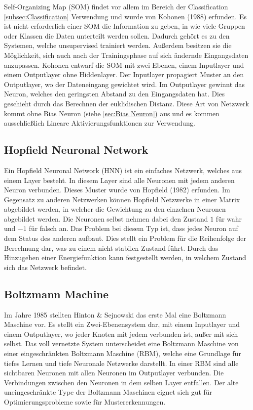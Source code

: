 Self-Organizing Map (SOM) findet vor allem im Bereich der Classification \ref{subsec:Classification} Verwendung und wurde von Kohonen (1988) erfunden. 
Es ist nicht erforderlich einer SOM die Information zu geben, in wie viele Gruppen oder Klassen die Daten unterteilt werden sollen. 
Dadurch gehört es zu den Systemen, welche unsupervised trainiert werden. 
Außerdem besitzen sie die Möglichkeit, sich auch nach der Trainingsphase auf sich ändernde Eingangsdaten anzupassen. 
Kohonen entwarf die SOM mit zwei Ebenen, einem Inputlayer und einem Outputlayer ohne Hiddenlayer. 
Der Inputlayer propagiert Muster an den Outputlayer, wo der Dateneingang gewichtet wird. 
Im Outputlayer gewinnt das Neuron, welches den geringsten Abstand zu den Eingangsdaten hat.
Dies geschieht durch das Berechnen der euklidischen Distanz. 
Diese Art von Netzwerk kommt ohne Bias Neuron (siehe \ref{sec:Bias Neuron}) aus und es kommen ausschließlich Lineare Aktivierungsfunktionen zur Verwendung.


\subsection{Hopfield Neuronal Network}

Ein Hopfield Neuronal Network (HNN) ist ein einfaches Netzwerk, welches aus einem Layer besteht. 
In diesem Layer sind alle Neuronen mit jedem anderen Neuron verbunden. 
Dieses Muster wurde von Hopfield (1982) erfunden. 
Im Gegensatz zu anderen Netzwerken können Hopfield Netzwerke in einer Matrix abgebildet werden, in welcher die Gewichtung zu den einzelnen Neuronen abgebildet werden. 
Die Neuronen selbst nehmen dabei den Zustand $1$ für wahr und $-1$ für falsch an.
Das Problem bei diesem Typ ist, dass jedes Neuron auf dem Status des anderen aufbaut.
Dies stellt ein Problem für die Reihenfolge der Berechnung dar, was zu einem nicht stabilen Zustand führt.
Durch das Hinzugeben einer Energiefunktion kann festgestellt werden, in welchem Zustand sich das Netzwerk befindet.

\subsection{Boltzmann Machine}

Im Jahre 1985 stellten Hinton \& Sejnowski das erste Mal eine Boltzmann Maschine vor.
Es stellt ein Zwei-Ebenensystem dar, mit einem Inputlayer und einem Outputlayer, wo jeder Knoten mit jedem verbunden ist, außer mit sich selbst.
Das voll vernetzte System unterscheidet eine Boltzmann Maschine von einer eingeschränkten Boltzmann Maschine (RBM), welche eine Grundlage für tiefes Lernen und tiefe Neuronale Netzwerke darstellt.
In einer RBM sind alle sichtbaren Neuronen mit allen Neuronen im Outputlayer verbunden. 
Die Verbindungen zwischen den Neuronen in dem selben Layer entfallen.
Der alte uneingeschränkte Type der Boltzmann Maschinen eignet sich gut für Optimierungsprobleme sowie für Mustererkennungen.

